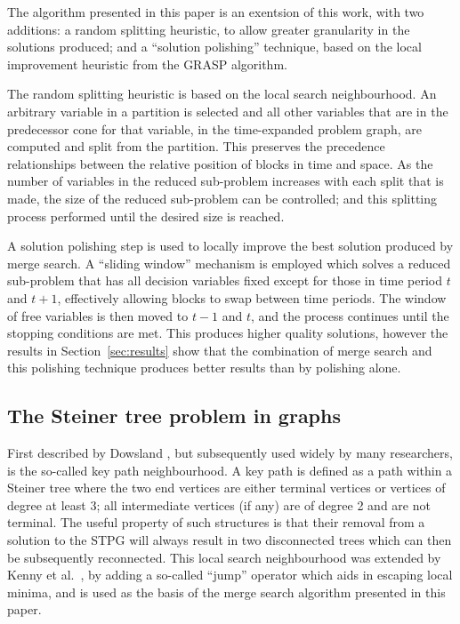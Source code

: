 \documentclass[journal]{IEEEtran}
\begin{document}
The algorithm presented in this paper is an exentsion of this work, with two additions: a random splitting heuristic, to allow greater granularity in the solutions produced; and a ``solution polishing'' technique, based on the local improvement heuristic from the GRASP algorithm.

The random splitting heuristic is based on the local search neighbourhood. An arbitrary variable in a partition is selected and all other variables that are in the predecessor cone for that variable, in the time-expanded problem graph, are computed and split from the partition. This preserves the precedence relationships between the relative position of blocks in time and space. As the number of variables in the reduced sub-problem increases with each split that is made, the size of the reduced sub-problem can be controlled; and this splitting process performed until the desired size is reached.

A solution polishing step is used to locally improve the best solution produced by merge search. A ``sliding window'' mechanism is employed which solves a reduced sub-problem that has all decision variables fixed except for those in time period $t$ and $t+1$, effectively allowing blocks to swap between time periods. The window of free variables is then moved to $t-1$ and $t$, and the process continues until the stopping conditions are met. This produces higher quality solutions, however the results in Section~\ref{sec:results} show that the combination of merge search and this polishing technique produces better results than by polishing alone.

\subsection{The Steiner tree problem in graphs}

First described by Dowsland \cite{kp:dowsland}, but subsequently used widely by many researchers, is the so-called key path neighbourhood. A key path is defined as a path within a Steiner tree where the two end vertices are either terminal vertices or vertices of degree at least 3; all intermediate  vertices (if any) are of degree 2 and are not terminal. The useful property of such structures is that their removal from a solution to the STPG will always result in two disconnected trees which can then be subsequently reconnected. This local search neighbourhood was extended by Kenny et al.~\cite{gecco16}, by adding a so-called ``jump'' operator which aids in escaping local minima, and is used as the basis of the merge search algorithm presented in this paper.
\end{document}
